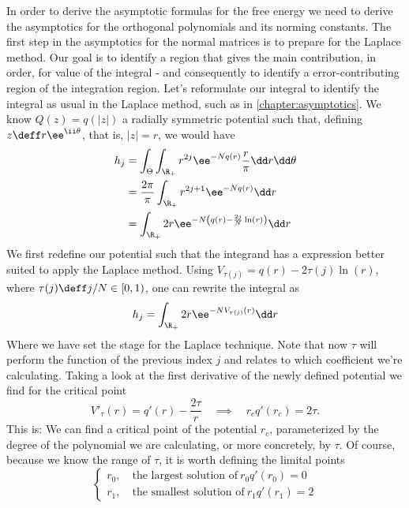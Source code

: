 In order to derive the asymptotic formulas for the free energy we need to derive the asymptotics for the orthogonal polynomials and its norming constants. The first step in the asymptotics for the normal matrices is to prepare for the Laplace method. Our goal is to identify a region that gives the main contribution, in order, for value of the integral - and consequently to identify a error-contributing region of the integration region. Let's reformulate our integral to identify the integral as usual in the Laplace method, such as in \autoref{chapter:asymptotics}. We know $Q(z) = q(|z|)$ a radially symmetric potential such that, defining $z \deff r \ee^{\ii \theta}$, that is, $|z| = r$, we would have
\begin{align}
	h_j & = \int_{\Theta} \int_{\R_+} r^{2j} \ee^{-N q(r)} \frac{r}{\pi} \dd r \dd \theta \\
	& = \frac{2 \pi}{\pi} \int_{\R_+} r^{2j+1} \ee^{-N q(r)} \dd r \\
	& =  \int_{\R_+} 2 r \ee^{-N \left( q(r) - \frac{2j}{N} \ln(r) \right)} \dd r
\end{align}
We first redefine our potential such that the integrand has a expression better suited to apply the Laplace method. Using $V_{\tau(j)} = q(r) - 2 \tau(j) \ln(r)$, where $\tau(j) \deff j/N \in [0, 1)$, one can rewrite the integral as
\begin{equation}
	h_j = \int_{\R_+} 2r \ee^{-N V_{\tau(j)}(r)} \dd r
\end{equation}
Where we have set the stage for the Laplace technique. Note that now $\tau$ will perform the function of the previous index $j$ and relates to which coefficient we're calculating. Taking a look at the first derivative of the newly defined potential we find for the critical point
\begin{equation}
	V'_\tau(r) = q'(r) - \frac{2\tau}{r} \quad \implies \quad r_c q'(r_c) = 2 \tau.
\end{equation}
This is: We can find a critical point of the potential $r_c$, parameterized by the degree of the polynomial we are calculating, or more concretely, by $\tau$. Of course, because we know the range of $\tau$, it is worth defining the limital points
\begin{equation}
	\begin{cases}
		r_0, \quad \text{the largest solution of} \ r_0 q'(r_0) = 0 \\
		r_ 1, \quad \text{the smallest solution of} \ r_1 q'(r_1) = 2
	\end{cases}
\end{equation}
